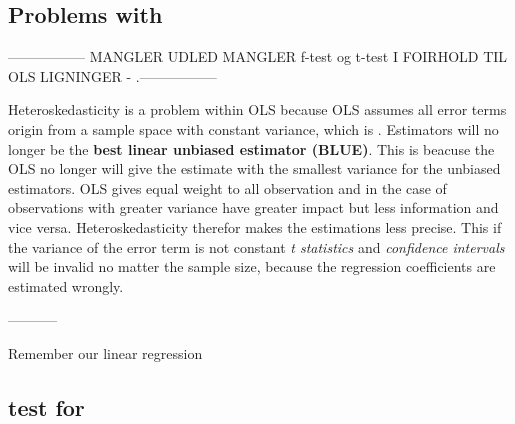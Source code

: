 \subsection{Problems with \hetero}


-----------------
MANGLER UDLED MANGLER f-test og t-test I FOIRHOLD TIL OLS LIGNINGER
- .-----------------


Heteroskedasticity is a problem within OLS because OLS assumes all error terms origin from a sample space with constant variance, which is \homo. Estimators will no longer be the \textbf{best linear unbiased estimator (BLUE)}. This is beacuse the OLS no longer will give the estimate with the smallest variance for the unbiased estimators. OLS gives equal weight to all observation and in the case of \hetero observations with greater variance have greater impact but less information and vice versa. Heteroskedasticity therefor makes the estimations less precise. This if the variance of the error term is not constant \textit{t statistics} and \textit{confidence intervals} will be invalid no matter the sample size, because the regression coefficients are estimated wrongly.

-----------

Remember our linear regression




























\subsection{test for \hetero}






